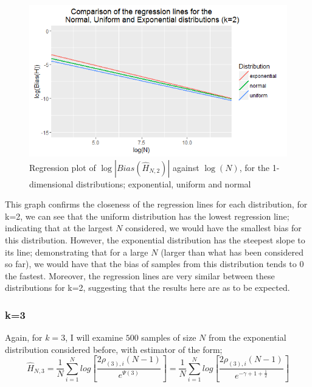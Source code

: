 \documentclass{article}
\begin{document}
\begin{figure}
  \begin{center}
    \includegraphics[width=\textwidth]{./Graphs/EUN_k=2_plot.png}
  \end{center}
\caption{Regression plot of $\log|Bias(\hat{H}_{N, 2})|$ against $\log(N)$, for the 1-dimensional distributions; exponential, uniform and normal}
  \label{E_U_N_k=2_graph}
\end{figure}

This graph confirms the closeness of the regression lines for each distribution, for k=2, we can see that the uniform distribution has the lowest regression line; indicating that at the largest $N$ considered, we would have the smallest bias for this distribution. However, the exponential distribution has the steepest slope to its line; demonstrating that for a large $N$ (larger than what has been considered so far), we would have that the bias of samples from this distribution tends to 0 the fastest. Moreover, the regression lines are very similar between these distributions for k=2, suggesting that the results here are as to be expected.




\subsubsection{k=3} \label{E_k=3}
Again, for $k=3$, I will examine $500$ samples of size $N$ from the exponential distribution considered before, with estimator of the form;
\begin{equation}
\hat{H}_{N, 3} = \frac{1}{N} \sum_{i=1}^{N} log \left[ \frac{2\rho_{(3),i} (N-1)}{e^{\Psi(3)}} \right] = \frac{1}{N} \sum_{i=1}^{N} log \left[ \frac{2\rho_{(3),i} (N-1)}{e^{-\gamma + 1 + \frac{1}{2}}} \right] \nonumber
\end{equation}
\end{document}

